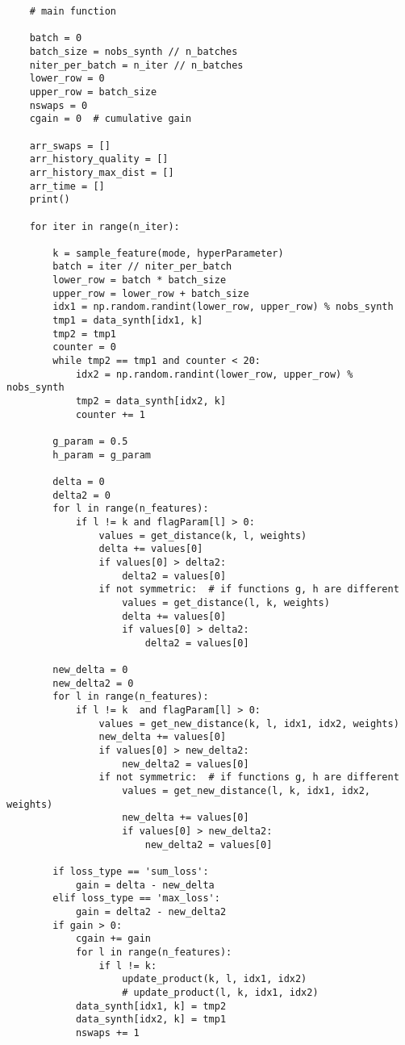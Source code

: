 \documentclass[oneside,10pt]{book}
\begin{document}
\begin{lstlisting}
    # main function

    batch = 0
    batch_size = nobs_synth // n_batches
    niter_per_batch = n_iter // n_batches
    lower_row = 0
    upper_row = batch_size
    nswaps = 0
    cgain = 0  # cumulative gain

    arr_swaps = []
    arr_history_quality = []
    arr_history_max_dist = []
    arr_time = []
    print()

    for iter in range(n_iter):

        k = sample_feature(mode, hyperParameter)
        batch = iter // niter_per_batch
        lower_row = batch * batch_size
        upper_row = lower_row + batch_size
        idx1 = np.random.randint(lower_row, upper_row) % nobs_synth
        tmp1 = data_synth[idx1, k]
        tmp2 = tmp1
        counter = 0
        while tmp2 == tmp1 and counter < 20:
            idx2 = np.random.randint(lower_row, upper_row) % nobs_synth
            tmp2 = data_synth[idx2, k]
            counter += 1

        g_param = 0.5
        h_param = g_param

        delta = 0
        delta2 = 0
        for l in range(n_features):
            if l != k and flagParam[l] > 0:
                values = get_distance(k, l, weights)
                delta += values[0]
                if values[0] > delta2:
                    delta2 = values[0]
                if not symmetric:  # if functions g, h are different
                    values = get_distance(l, k, weights)
                    delta += values[0]
                    if values[0] > delta2:
                        delta2 = values[0]

        new_delta = 0
        new_delta2 = 0
        for l in range(n_features):
            if l != k  and flagParam[l] > 0:
                values = get_new_distance(k, l, idx1, idx2, weights)
                new_delta += values[0]
                if values[0] > new_delta2:
                    new_delta2 = values[0]
                if not symmetric:  # if functions g, h are different
                    values = get_new_distance(l, k, idx1, idx2, weights)
                    new_delta += values[0]
                    if values[0] > new_delta2:
                        new_delta2 = values[0]

        if loss_type == 'sum_loss':
            gain = delta - new_delta
        elif loss_type == 'max_loss':
            gain = delta2 - new_delta2
        if gain > 0:
            cgain += gain
            for l in range(n_features):
                if l != k:
                    update_product(k, l, idx1, idx2)
                    # update_product(l, k, idx1, idx2)
            data_synth[idx1, k] = tmp2
            data_synth[idx2, k] = tmp1
            nswaps += 1


\end{lstlisting}
\end{document}

